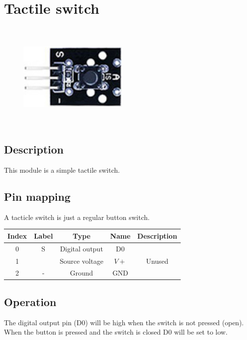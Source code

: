 \section{Tactile switch}
\begin{figure}[H]
    \centering
    \includegraphics[angle=0, keepaspectratio=true, scale=1, width=200px, height=200px]{images/tactile.jpg}
\end{figure}
\subsection*{Description}
This module is a simple tactile switch.
\subsection*{Pin mapping}
A tacticle switch is just a regular button switch.%
\begin{table}[H]
    \centering
    \begin{tabular}{|c|c|c|c|c|}
    \hline
    Index &Label &Type &Name &Description\\ \hline
    0 &S &Digital output &D0 &\\ \hline
    1 & &Source voltage &$V+$ &Unused\\ \hline
    2 &- &Ground &GND &\\ \hline
    \end{tabular}
\end{table}
\subsection*{Operation}
The digital output pin (D0) will be high when the switch is not pressed (open). When the button is pressed and the switch is closed D0 will be set to low.
%